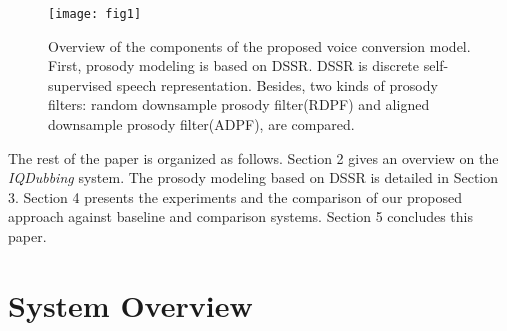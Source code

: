 \documentclass{article}
\begin{document}
\begin{figure*}[htb]

\begin{minipage}[b]{1.0\linewidth}
  \centering
  \centerline{\texttt{[image: fig1]}}
\end{minipage}
%
\caption{Overview of the components of the proposed voice conversion model. First, prosody modeling is based on DSSR. DSSR is discrete self-supervised speech representation. Besides, two kinds of prosody filters: random downsample prosody filter(RDPF) and aligned downsample prosody filter(ADPF), are compared.}
\label{fig:res}
%
\end{figure*}

The rest of the paper is organized as follows. Section 2 gives an overview on the \textit{IQDubbing} system. The prosody modeling based on DSSR is detailed in Section 3. Section 4 presents the experiments and the comparison of our proposed approach against baseline and comparison systems. Section 5 concludes this paper.

\section{System Overview}
\label{sec:format}
\end{document}
